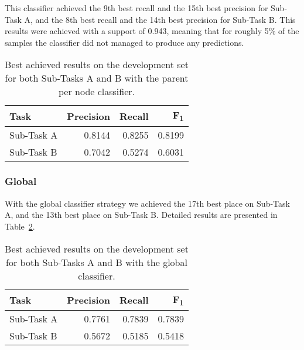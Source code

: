 \documentclass[11pt,a4paper]{article}
\begin{document}
This classifier achieved the 9th best recall and the 15th best precision for
Sub-Task A, and the 8th best recall and the 14th best precision for Sub-Task B.
This results were achieved with a support of 0.943, meaning that for roughly 5\%
of the samples the classifier did not managed to produce any predictions.


\begin{table}[!h]
\begin{center}
\begin{tabular}{|l|r|r|r|}
\hline\centering\textbf{Task}  & \textbf{Precision} &  \textbf{Recall} &  \textbf{F\textsubscript{1}}\\
\hline
 Sub-Task A   &  0.8144 & 0.8255 & 0.8199 \\
 Sub-Task B   &  0.7042 & 0.5274 & 0.6031 \\
\hline
\end{tabular}
\end{center}
\caption{\label{local_devset-results} Best achieved results on the development
          set for both Sub-Tasks A and B with the parent per node classifier.}
\end{table}





\subsubsection{Global}

With the global classifier strategy we achieved the 17th best place on Sub-Task A,
and the 13th best place on Sub-Task B. Detailed results are presented in
Table~\ref{global_devset-results}.

\begin{table}[!h]
\begin{center}
\begin{tabular}{|l|r|r|r|}
\hline\centering\textbf{Task}  & \textbf{Precision} &  \textbf{Recall} &  \textbf{F\textsubscript{1}}\\
\hline
 Sub-Task A   &  0.7761 & 0.7839 & 0.7839 \\
 Sub-Task B   &  0.5672 & 0.5185 & 0.5418 \\
\hline
\end{tabular}
\end{center}
\caption{\label{global_devset-results} Best achieved results on the development
          set for both Sub-Tasks A and B with the global classifier.}
\end{table}
\end{document}
